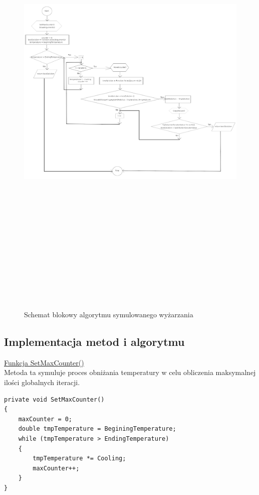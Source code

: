 \documentclass[twoside]{projektInzynierskiMS1}
\newcommand{\si}{ś}
\begin{document}
\begin{figure}[H]
		\includegraphics[height=22cm, width=16cm]{schematBlokowy.png}\\
	\caption{Schemat blokowy algorytmu symulowanego wyżarzania}
\end{figure}

\subsection{Implementacja metod i algorytmu}

\underline{Funkcja SetMaxCounter()} \\
Metoda ta symuluje proces obniżania temperatury w celu obliczenia maksymalnej ilo\si ci globalnych iteracji. \\
\begin{verbatim}
private void SetMaxCounter()
{
    maxCounter = 0;
    double tmpTemperature = BeginingTemperature;
    while (tmpTemperature > EndingTemperature)
    {
        tmpTemperature *= Cooling;
        maxCounter++;
    }
}
\end{verbatim}
\end{document}
